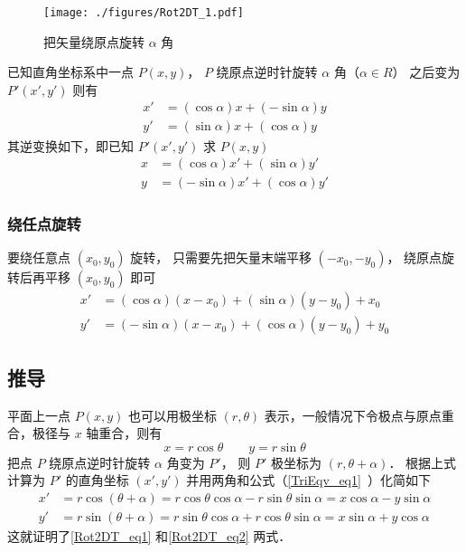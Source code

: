 

\begin{figure}[ht]
\centering
\texttt{[image: ./figures/Rot2DT\_1.pdf]}
\caption{把矢量绕原点旋转 $\alpha$ 角} \label{Rot2DT_fig1}
\end{figure}

已知直角坐标系中一点 $P(x,y)$， $P$ 绕原点逆时针旋转 $\alpha $ 角（$\alpha  \in R$） 之后变为 $P'(x',y')$ 则有
\begin{align}\label{Rot2DT_eq1}
x' &= (\cos \alpha)x + (- \sin \alpha)y \\
\label{Rot2DT_eq2}
y' &= (\sin \alpha)x + (\cos \alpha)y
\end{align}
其逆变换如下，即已知 $P'(x',y')$ 求 $P(x,y)$ 
\begin{align}\label{Rot2DT_eq3}
x &= ( \cos \alpha  )x' + ( \sin \alpha  )y' \\
\label{Rot2DT_eq4}
y &= ( - \sin \alpha)x' + ( \cos \alpha )y'
\end{align}

\subsubsection{绕任点旋转}
要绕任意点 $(x_0, y_0)$ 旋转， 只需要先把矢量末端平移 $(-x_0, -y_0)$， 绕原点旋转后再平移 $(x_0, y_0)$ 即可
\begin{equation}\label{Rot2DT_eq5}
\begin{aligned}
x' &= ( \cos \alpha  )(x-x_0) + ( \sin \alpha  )(y-y_0) + x_0 \\
y' &= ( - \sin \alpha)(x-x_0) + ( \cos \alpha )(y-y_0) + y_0
\end{aligned}
\end{equation}

\subsection{推导}

平面上一点 $P(x,y)$ 也可以用极坐标 $(r, \theta)$ 表示，一般情况下令极点与原点重合，极径与 $x$ 轴重合，则有
\begin{equation}
x = r\cos \theta \qquad y = r\sin \theta 
\end{equation}     
把点 $P$ 绕原点逆时针旋转 $\alpha $ 角变为 $P'$， 则 $P'$ 极坐标为 $(r, \theta  + \alpha)$． 根据上式计算为 $P'$ 的直角坐标 $(x', y')$ 并用两角和公式（\autoref{TriEqv_eq1}~）化简如下
\begin{align}
x' &= r\cos(\theta  + \alpha) = r\cos\theta \cos\alpha  - r\sin\theta \sin\alpha  = x\cos\alpha  - y\sin\alpha \\
y' &= r\sin(\theta  + \alpha) = r\sin\theta \cos\alpha  + r\cos\theta \sin\alpha  = x\sin\alpha  + y\cos\alpha 
\end{align} 
这就证明了\autoref{Rot2DT_eq1} 和\autoref{Rot2DT_eq2} 两式．

